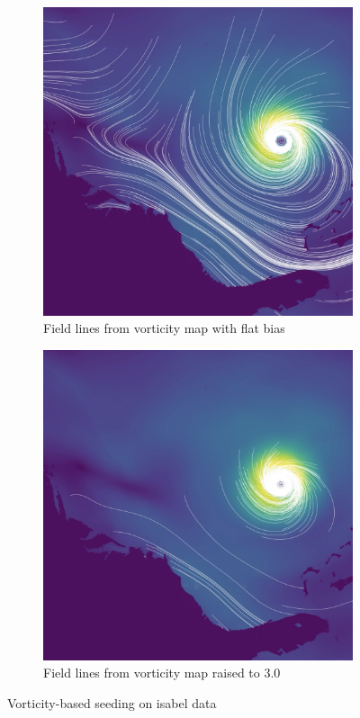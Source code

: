 \documentclass{article}
\begin{document}
\begin{figure}[h!]
    \centering
    \begin{subfigure}{0.65\textwidth}
        \centering
        \includegraphics[width=\textwidth, angle=270]{vort_result.png}
        \caption{Field lines from vorticity map with flat bias}
    \end{subfigure}
    \hfill
    \begin{subfigure}{0.65\textwidth}
        \centering
        \includegraphics[width=\textwidth, angle=270]{vort_result_3_0.png}
        \caption{Field lines from vorticity map raised to 3.0}
    \end{subfigure}
    \caption{Vorticity-based seeding on isabel data}
\end{figure}
\end{document}

